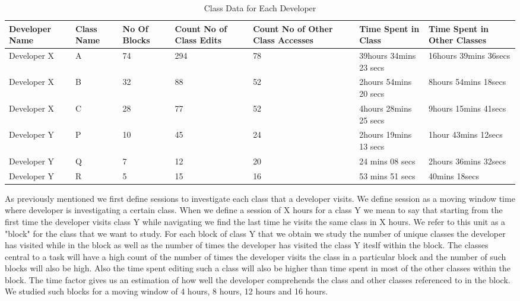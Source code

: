 \begin{center}
\begin{table*}[t]
	\centering
	\caption{Class Data for Each Developer}
	\begin{tabular}{|l|l|l|l|l|l|l|}
	\hline

Developer Name & Class Name & No Of Blocks &Count No of Class Edits & Count No of Other Class Accesses & Time Spent in Class & Time Spent in Other Classes\\
\hline\hline
Developer X & A & 74 & 294 & 78 & 39hours 34mins 23 secs & 16hours 39mins 36secs\\
\hline
Developer X & B & 32 & 88 & 52 & 2hours 54mins 20 secs & 8hours 54mins 18secs\\
\hline
Developer X & C & 28 & 77 & 52 & 4hours 28mins 25 secs & 9hours 15mins 41secs\\
\hline
Developer Y & P & 10 & 45 & 24 & 2hours 19mins 13 secs & 1hour 43mins 12secs\\
\hline
Developer Y & Q & 7 & 12 & 20 & 24 mins 08 secs & 2hours 36mins 32secs\\
\hline
Developer Y & R & 5 & 15 & 16 & 53 mins 51 secs & 40mins 18secs\\
\hline

	\end{tabular}
	\label{fig:AnalysisData}
\end{table*}
\end{center}

As previously mentioned we first define sessions to investigate each class that a developer visits. We define session as a moving window time where developer is investigating a certain class. When we define a session of X hours for a class Y we mean to say that starting from the first time the developer visits class Y while navigating we find the last time he visits the same class in X hours. We refer to this unit as a  "block" for the class that we want to study. For each block of class Y that we obtain we study the number of unique classes the developer has visited while in the block as well as the number of times the developer has visited the class Y iteslf within the block. The classes central to a task will have a high count of the number of times the developer visits the class in a particular block and the number of such blocks will also be high. Also the time spent editing such a class will also be higher than time spent in most of the other classes within the block. The time factor gives us an estimation of how well the developer comprehends the class and other classes referenced to in the block. We studied such blocks for a moving window of 4 hours, 8 hours, 12 hours and 16 hours. 

